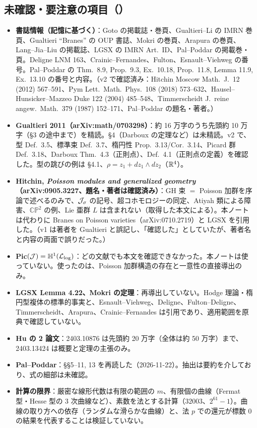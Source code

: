 \subsection{未確認・要注意の項目（\tQ）}
\begin{itemize}
\item \textbf{書誌情報（記憶に基づく）}：Goto の掲載誌・巻頁、Gualtieri--Li の IMRN 巻頁、Gualtieri ``Branes'' の OUP 書誌、Mokri の巻頁、Arapura の巻頁、Lang--Jia--Liu の掲載誌、LGSX の IMRN Art.\ ID、Pal--Poddar の掲載巻・頁。Deligne LNM 163、Crainic--Fernandes、Fulton、Esnault--Viehweg の番号。Pal--Poddar の Thm.\ 8.9, Prop.\ 9.3, Ex.\ 10.18, Prop.\ 11.8, Lemma 11.9, Ex.\ 13.10 の番号と内容。（v2 で確認済み：Hitchin Moscow Math.\ J.\ 12 (2012) 567--591、Pym Lett.\ Math.\ Phys.\ 108 (2018) 573--632、Hausel--Hunsicker--Mazzeo Duke 122 (2004) 485--548、Timmerscheidt J.\ reine angew.\ Math.\ 379 (1987) 152--171、Pal--Poddar の題名・著者。）
\item \textbf{Gualtieri 2011（arXiv:math/0703298）}：約 16 万字のうち先頭約 10 万字（\S3 の途中まで）を精読。\S4（Darboux の定理など）は未精読。v2 で、型 Def.\ 3.5、標準束 Def.\ 3.7、楕円性 Prop.\ 3.13/Cor.\ 3.14、Picard 群 Def.\ 3.18、Darboux Thm.\ 4.3（正則点）、Def.\ 4.1（正則点の定義）を確認した。型の跳びの例は \S4.1、$\rho=z_1+dz_1\wedge dz_2$（$\mathbb R^4$）。
\item \textbf{Hitchin, \emph{Poisson modules and generalized geometry}（arXiv:0905.3227、題名・著者は確認済み）}：GH 束 $=$ Poisson 加群を序論で述べるのみで、$\mathcal J_\sigma$ の記号、超コホモロジーの同定、Atiyah 類による障害、$\mathbb{CP}^2$ の例、Lie 亜群 $L$ は含まれない（取得した本文による）。本ノートは代わりに Branes on Poisson varieties（arXiv:0710.2719）と LGSX を引用した。（v1 は著者を Gualtieri と誤記し、「確認した」としていたが、著者名と内容の両面で誤りだった。）
\item \textbf{Pic$(\mathcal J)=\mathbb H^1(\mathcal L_{\log})$}：どの文献でも本文を確認できなかった。本ノートは使っていない。使ったのは、Poisson 加群構造の存在と一意性の直接導出のみ。
\item \textbf{LGSX Lemma 4.22、Mokri の定理}：再導出していない。Hodge 理論・楕円型複体の標準的事実と、Esnault--Viehweg、Deligne、Fulton--Deligne、Timmerscheidt、Arapura、Crainic--Fernandes は引用であり、適用範囲を原典で確認していない。
\item \textbf{Hu の 2 論文}：2403.10876 は先頭約 20 万字（全体は約 50 万字）まで、2403.13424 は概要と定理の主張のみ。
\item \textbf{Pal--Poddar}：\S\S5--11, 13 を再読した（2026-11-22）。抽出は要約を介しており、式の細部は未確認。
\item \textbf{計算の限界}：厳密な線形代数は有限の範囲の $m$、有限個の曲線（Fermat 型・Hesse 型の 3 次曲線など）、素数を法とする計算（$32003$、$2^{61}-1$）。曲線の取り方への依存（ランダムな滑らかな曲線）と、法 $p$ での還元が標数 0 の結果を代表することは検証していない。
\end{itemize}

